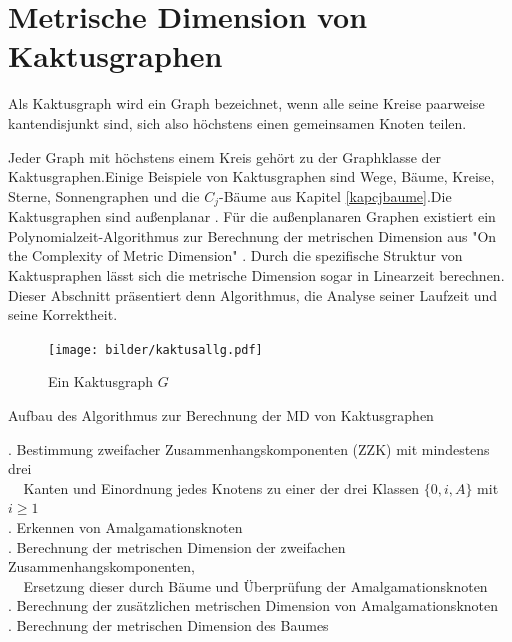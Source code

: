 \chapter{Metrische Dimension von Kaktusgraphen}
\label{kapkaktus}
\begin{defi}
Als Kaktusgraph wird ein Graph bezeichnet, wenn alle seine Kreise paarweise kantendisjunkt sind, sich also höchstens einen gemeinsamen Knoten teilen.
\end{defi}
Jeder Graph mit höchstens einem Kreis gehört zu der Graphklasse der Kaktusgraphen.\newline Einige Beispiele von Kaktusgraphen sind Wege, Bäume, Kreise, Sterne, Sonnengraphen und die $C_j$-Bäume aus Kapitel \ref{kapcjbaume}.\newline Die Kaktusgraphen sind außenplanar \cite{graphclasses}. Für die außenplanaren Graphen existiert ein Polynomialzeit-Algorithmus zur Berechnung der metrischen Dimension aus "On the Complexity of Metric Dimension" \cite{aussenplanar}. Durch die spezifische Struktur von Kaktuspraphen lässt sich die metrische Dimension sogar in Linearzeit berechnen. Dieser Abschnitt präsentiert denn Algorithmus, die Analyse seiner Laufzeit und seine Korrektheit.
\begin{figure}[h!]
		\centering
 		 \texttt{[image: bilder/kaktusallg.pdf]}
   \caption{Ein Kaktusgraph $G$}
   \label{gk}
  	 \end{figure}
  	 \vspace{-2mm}
\begin{algorithm}
\caption{Aufbau des Algorithmus zur Berechnung der MD von Kaktusgraphen}
\begin{algorithmic}
\vspace{2mm}
\vspace{2mm}
\vspace{2mm}
. Bestimmung zweifacher Zusammenhangskomponenten (ZZK) mit mindestens drei\\$\;\;\;\;$Kanten und Einordnung jedes Knotens zu einer der drei Klassen $\{0,i,A\}$ mit $i \geq 1$\\
\vspace{2mm}
. Erkennen von Amalgamationsknoten\\
\vspace{2mm}
. Berechnung der metrischen Dimension der zweifachen Zusammenhangskomponenten,\\$\;\;\;\;$Ersetzung dieser durch Bäume und Überprüfung der Amalgamationsknoten\\
\vspace{2mm}
. Berechnung der zusätzlichen metrischen Dimension von Amalgamationsknoten\\
\vspace{2mm}
. Berechnung der metrischen Dimension des Baumes
\vspace{2mm}
\end{algorithmic}
\end{algorithm}
\newpage
